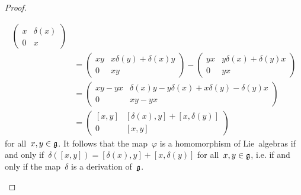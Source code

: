 \begin{proof}
\begin{enumerate}
\begin{align*}
        \begin{pmatrix}
          x & \delta(x) \\
          0 & x
        \end{pmatrix}
        \\
        &=
        \begin{pmatrix}
          xy  & x \delta(y) + \delta(x) y \\
          0   & xy
        \end{pmatrix}
        -
        \begin{pmatrix}
          yx  & y \delta(x) + \delta(y) x \\
          0   & yx
        \end{pmatrix}
        \\
        &=
        \begin{pmatrix}
          xy - yx & \delta(x) y - y \delta(x) + x \delta(y) - \delta(y) x \\
          0       & xy - yx
        \end{pmatrix}
        \\
        &=
        \begin{pmatrix}
          [x,y] & [\delta(x), y] + [x, \delta(y)] \\
          0     & [x,y]
        \end{pmatrix}
      \end{align*}
      for all~$x, y \in \mathfrak{g}$.
      It follows that the map~$\varphi$ is a homomorphism of Lie~algebras if and only if~$\delta([x,y]) = [\delta(x), y] + [x, \delta(y)]$ for all~$x, y \in \mathfrak{g}$, i.e. if and only if the map~$\delta$ is a derivation of~$\mathfrak{g}$.
    \qedhere
  \end{enumerate}
\end{proof}



